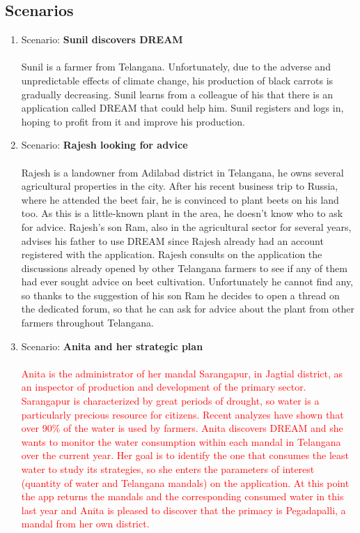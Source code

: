 \subsection{Scenarios}

\begin{enumerate}

\item Scenario: \textbf{Sunil discovers DREAM}\\\\
Sunil is a farmer from Telangana. Unfortunately, due to the adverse and unpredictable effects of climate change, his production of black carrots is gradually decreasing. Sunil learns from a colleague of his that there is an application called DREAM that could help him. Sunil registers and logs in, hoping to profit from it and improve his production.\\

\item Scenario: \textbf{Rajesh looking for advice}\\\\
Rajesh is a landowner from Adilabad district in Telangana, he owns several agricultural properties in the city. After his recent business trip to Russia, where he attended the beet fair, he is convinced to plant beets on his land too. As this is a little-known plant in the area, he doesn't know who to ask for advice. Rajesh's son Ram, also in the agricultural sector for several years, advises his father to use DREAM since Rajesh already had an account registered with the application.
Rajesh consults on the application the discussions already opened by other Telangana farmers to see if any of them had ever sought advice on beet cultivation. Unfortunately he cannot find any, so thanks to the suggestion of his son Ram he decides to open a thread on the dedicated forum, so that he can ask for advice about the plant from other farmers throughout Telangana.\\

\item Scenario: \textbf{Anita and her strategic plan}\\\\
\textcolor{red}{Anita is the administrator of her mandal Sarangapur, in Jagtial district, as an inspector of production and development of the primary sector. Sarangapur is characterized by great periods of drought, so water is a particularly precious resource for citizens.
Recent analyzes have shown that over 90\% of the water is used by farmers.
Anita discovers DREAM and she wants to monitor the water consumption within each mandal in Telangana over the current year. Her goal is to identify the one that consumes the least water to study its strategies, so she enters the parameters of interest (quantity of water and Telangana mandals) on the application.
At this point the app returns the mandals and the corresponding consumed water in this last year and Anita is pleased to discover that the primacy is Pegadapalli, a mandal from her own district.}\\


\end{enumerate}
